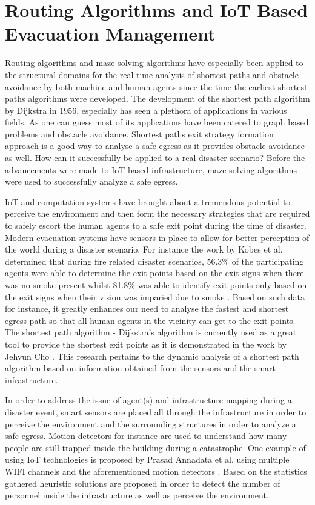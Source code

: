 \section{Routing Algorithms and IoT Based Evacuation Management}
\label{sec:pastwork:Routing Algorithms and IoT Based Evacuation Management}

Routing algorithms and maze solving algorithms have especially been applied to the structural domains for the real time analysis of shortest paths and obstacle avoidance by both machine and human agents since the time the earliest shortest paths algorithms were developed. The development of the shortest path algorithm by Dijkstra in 1956, especially has seen a plethora of applications in various fields. As one can guess most of its applications have been catered to graph based problems and obstacle avoidance. Shortest paths exit strategy formation approach is a good way to analyse a safe egress as it provides obstacle avoidance as well. How can it successfully be applied to a real disaster scenario? Before the advancements were made to IoT based infrastructure, maze solving algorithms were used to successfully analyze a safe egress. 

IoT and computation systems have brought about a tremendous potential to perceive the environment and then form the necessary strategies that are required to safely escort the human agents to a safe exit point during the time of disaster. Modern evacuation systems have sensors in place to allow for better perception of the world during a disaster scenario. For instance the work by Kobes et al. determined that during fire related disaster scenarios, 56.3\% of the participating agents were able to determine the exit points based on the exit signs when there was no smoke present whilst 81.8\% was able to identify exit points only based on the exit signs when their vision was imparied due to smoke \cite{ref11}. Based on such data for instance, it greatly enhances our need to analyse the fastest and shortest egress path so that all human agents in the vicinity can get to the exit points. The shortest path algorithm - Dijkstra's algorithm is currently used as a great tool to provide the shortest exit points as it is demonstrated in the work by Jehyun Cho \cite{ref12}. This research pertains to the dynamic analysis of a shortest path algorithm based on information obtained from the sensors and the smart infrastructure.  

In order to address the issue of agent(s) and infrastructure mapping during a disaster event, smart sensors are placed all through the infrastructure in order to perceive the environment and the surrounding structures in order to analyze a safe egress. Motion detectors for instance are used to understand how many people are still trapped inside the building during a catastrophe. One example of using IoT technologies is proposed by Prasad Annadata et al. using multiple WIFI channels and the aforementioned motion detectors \cite{ref13}. Based on the statistics gathered heuristic solutions are proposed in order to detect the number of personnel inside the infrastructure as well as perceive the environment. 

